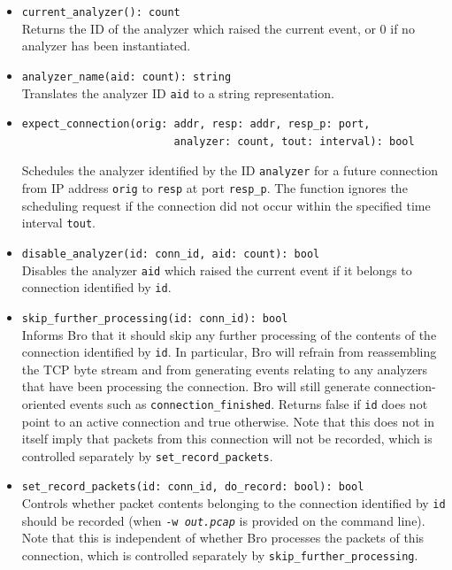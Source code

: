 \documentclass[10pt,landscape]{article}
\begin{document}
\begin{multicols*}{2}
\begin{itemize}
  \item \verb|current_analyzer(): count|\\
    Returns the ID of the analyzer which raised the current event, or 0 if no
    analyzer has been instantiated.
  \item \verb|analyzer_name(aid: count): string|\\
    Translates the analyzer ID \verb|aid| to a string representation.
  \item
\begin{verbatim}
expect_connection(orig: addr, resp: addr, resp_p: port,
          				analyzer: count, tout: interval): bool
\end{verbatim}
    Schedules the analyzer identified by the ID \verb|analyzer| for a future
    connection from IP address \verb|orig| to \verb|resp| at port
    \verb|resp_p|. The function ignores the scheduling request if the
    connection did not occur within the specified time interval \verb|tout|.
  \item \verb|disable_analyzer(id: conn_id, aid: count): bool|\\
    Disables the analyzer \verb|aid| which raised the current event if it
    belongs to connection identified by \verb|id|.
  \item \verb|skip_further_processing(id: conn_id): bool|\\
    Informs Bro that it should skip any further processing of the contents of
    the connection identified by \verb|id|. In particular, Bro will refrain
    from reassembling the TCP byte stream and from generating events relating
    to any analyzers that have been processing the connection. Bro will still
    generate connection-oriented events such as \verb|connection_finished|.
    Returns false if \verb|id| does not point to an active connection and
    true otherwise. Note that this does not in itself imply that packets from
    this connection will not be recorded, which is controlled separately by
    \verb|set_record_packets|.
  \item \verb|set_record_packets(id: conn_id, do_record: bool): bool|\\
    Controls whether packet contents belonging to the connection identified by
    \verb|id| should be recorded (when \texttt{-w \textit{out.pcap}} is
    provided on the command line).
    Note that this is independent of whether Bro processes the packets of this
    connection, which is controlled separately by
    \verb|skip_further_processing|.

\end{itemize}
\end{multicols*}
\end{document}
